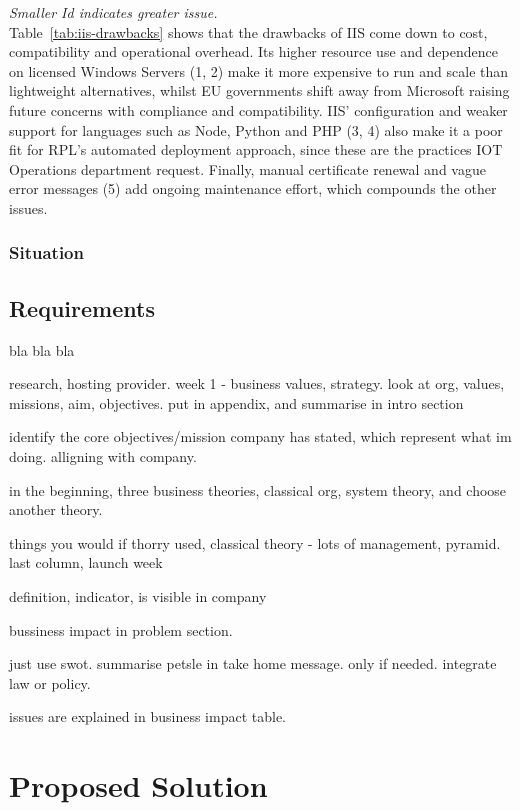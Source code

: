 \documentclass{article}
\begin{document}
\emph{Smaller Id indicates greater issue.}
\\

Table~\ref{tab:iis-drawbacks} shows that the drawbacks of IIS come down to cost, compatibility and operational overhead.
Its higher resource use and dependence on licensed Windows Servers (1, 2) make it more expensive to run and scale than lightweight alternatives, whilst EU governments shift away from Microsoft raising future concerns with compliance and compatibility.
IIS' configuration and weaker support for languages such as Node, Python and PHP (3, 4) also make it a poor fit for RPL’s automated deployment approach, since these are the practices IOT Operations department request.
Finally, manual certificate renewal and vague error messages (5) add ongoing maintenance effort, which compounds the other issues.


\pagebreak{}


\subsubsection{Situation}

\subsection{Requirements}
bla bla bla

research, hosting provider. 
week 1 - business values, strategy. look at org, values, missions, aim, objectives. put in appendix, and summarise in intro section

identify the core objectives/mission company has stated, which represent what im doing. alligning with company.

in the beginning, three business theories, classical org, system theory, and choose another theory.

things you would if thorry used, classical theory - lots of management, pyramid. last column, launch week

definition, indicator, is visible in company

bussiness impact in problem section. 

just use swot. summarise petsle in take home message. only if needed. integrate law or policy.

issues are explained in business impact table. 


\pagebreak{}
\section{Proposed Solution}
\end{document}
